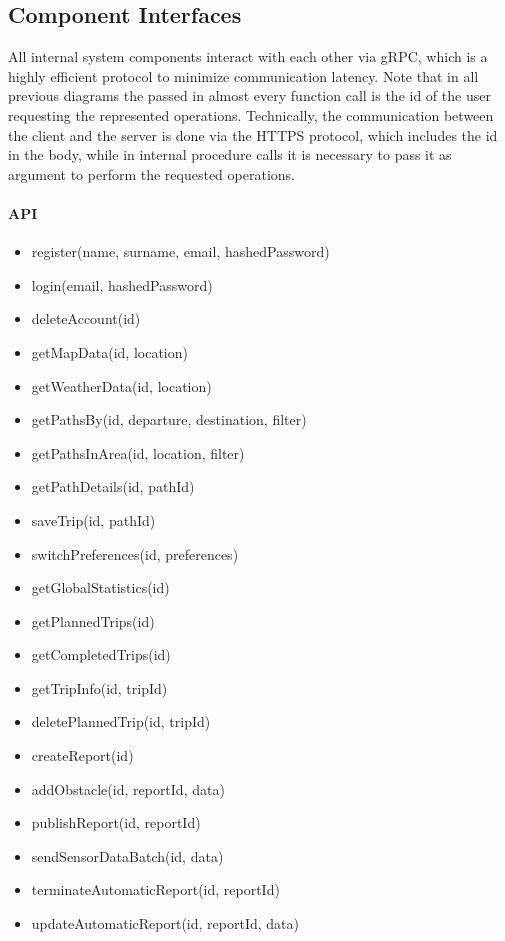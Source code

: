 \subsection{Component Interfaces}
All internal system components interact with each other via gRPC, which is a highly efficient protocol to minimize communication latency. Note that in all previous diagrams the  passed in almost every function call is the id of the user requesting the represented operations. Technically, the communication between the client and the server is done via the HTTPS protocol, which includes the id in the body, while in internal procedure calls it is necessary to pass it as argument to perform the requested operations.

\newpage
\paragraph{API}
\begin{itemize}
    \item register(name, surname, email, hashedPassword)
    \item login(email, hashedPassword)
    \item deleteAccount(id)
    \item getMapData(id, location)
    \item getWeatherData(id, location)
    \item getPathsBy(id, departure, destination, filter)
    \item getPathsInArea(id, location, filter)
    \item getPathDetails(id, pathId)
    \item saveTrip(id, pathId)
    \item switchPreferences(id, preferences)
    \item getGlobalStatistics(id)
    \item getPlannedTrips(id)
    \item getCompletedTrips(id)
    \item getTripInfo(id, tripId)
    \item deletePlannedTrip(id, tripId)
    \item createReport(id)
    \item addObstacle(id, reportId, data)
    \item publishReport(id, reportId)
    \item sendSensorDataBatch(id, data)
    \item terminateAutomaticReport(id, reportId)
    \item updateAutomaticReport(id, reportId, data)
\end{itemize}

